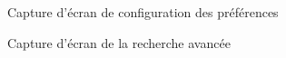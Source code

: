 \begin{figure}[H]
    \label{fig-preferences}
    \noindent{}
    \caption{Capture d'écran de configuration des préférences}
\end{figure}

\begin{figure}[H]
    \label{fig-recherche-avancee}
    \noindent{}
    \caption{Capture d'écran de la recherche avancée}
\end{figure}


